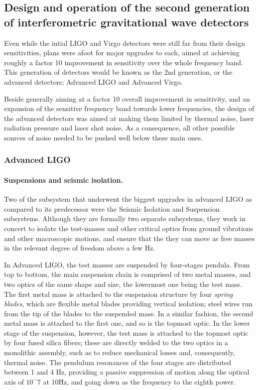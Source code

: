 \subsection{Design and operation of the second generation of interferometric gravitational wave detectors}\label{subsec:2ndgen}

Even while the intial LIGO and Virgo detectors were still far from their design sensitivities, plans were afoot for major 
upgrades to each, aimed at achieving roughly a factor 10 improvement in sensitivity over the whole frequency band. 
This generation of detectors would be known as the 2nd generation, or the advanced detectors; Advanced LIGO and 
Advanced Virgo. 

Beside generally aiming at a factor 10 overall improvement in sensitivity, and an expansion of the sensitive 
frequency band towards lower frequencies, the design of the advanced detectors was aimed at making them 
limited by thermal noise, laser radiation pressure and laser shot noise. As a consequence, all other possible 
sources of noise needed to be pushed well below these main ones.

\subsubsection{Advanced LIGO}


\paragraph*{Suspensions and seismic isolation.}
Two of the subsystem that underwent the biggest upgrades in advanced LIGO as compared 
to its predecessor were the Seismic Isolation and Suspension subsystems. Although they 
are formally two separate subsystems, they work in concert to isolate the test-masses and 
other critical optics from ground vibrations and other macroscopic motions, and ensure 
that the they can move as free masses in the relevant degree of freedom above a few Hz.

In Advanced LIGO, the test masses are suspended by four-stages pendula. From top to 
bottom, the main suspension chain is comprised of two metal masses, and two optics 
of the same shape and size, the lowermost one being the test mass. The first metal mass 
is attached to the suspension structure by four \textit{spring blades}, which are flexible 
metal blades providing vertical isolation; steel wires run from the tip of the blades to the 
suspended mass. In a similar fashion, the second metal mass is attached to the first one, 
and so is the topmost optic. In the lower stage of the suspension, however, the test mass 
is attached to the topmost optic by four fused silica fibers; these are directly welded to 
the two optics in a monolithic assembly, such as to reduce mechanical losses and, 
consequently, thermal noise. The pendulum resonances of the four stages are 
distributed between 1 and 4 Hz, providing a passive suppression of motion along 
the optical axis of $10^-7$ at 10\.Hz, and going down as the frequency to the eighth power.

